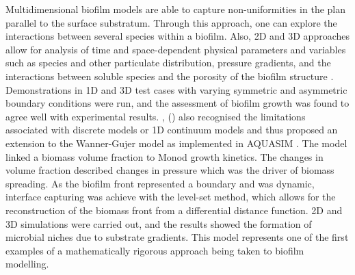 Multidimensional biofilm models are able to capture non-uniformities in the plan parallel to the surface substratum. Through this approach, one can explore the interactions between several species within a biofilm. Also, 2D and 3D approaches allow for analysis of time and space-dependent physical parameters and variables such as species and other particulate distribution, pressure gradients, and the interactions between soluble species and the porosity of the biofilm structure \cite{eberl2001}. Demonstrations in 1D and 3D test cases with varying symmetric and asymmetric boundary conditions were run, and the assessment of biofilm growth was found to agree well with experimental results. \cite{alpkvist2007}, (\cite{alpkvist2007}) also recognised the limitations associated with discrete models or 1D continuum models and thus proposed an extension to the Wanner-Gujer model as implemented in AQUASIM \cite{wanner1986}. The model linked a biomass volume fraction to Monod growth kinetics. The changes in volume fraction described changes in pressure which was the driver of biomass spreading. As the biofilm front represented a boundary and was dynamic, interface capturing was achieve with the level-set method, which allows for the reconstruction of the biomass front from a differential distance function. 2D and 3D simulations were carried out, and the results showed the formation of microbial niches due to substrate gradients. This model represents one of the first examples of a mathematically rigorous approach being taken to biofilm modelling.

